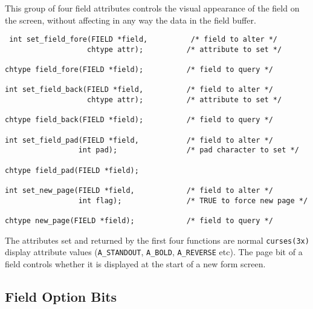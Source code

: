This group of four field attributes controls the visual appearance
of the field on the screen, without affecting in any way the data
in the field buffer.
\begin{verbatim} int set_field_fore(FIELD *field,          /* field to alter */
                   chtype attr);          /* attribute to set */

chtype field_fore(FIELD *field);          /* field to query */

int set_field_back(FIELD *field,          /* field to alter */
                   chtype attr);          /* attribute to set */

chtype field_back(FIELD *field);          /* field to query */

int set_field_pad(FIELD *field,           /* field to alter */
                 int pad);                /* pad character to set */

chtype field_pad(FIELD *field);

int set_new_page(FIELD *field,            /* field to alter */
                 int flag);               /* TRUE to force new page */

chtype new_page(FIELD *field);            /* field to query */
\end{verbatim}
The attributes set and returned by the first four functions are normal
\texttt{curses(3x)} display attribute values (\texttt{A\_STANDOUT},
\texttt{A\_BOLD}, \texttt{A\_REVERSE} etc).
The page bit of a field controls whether it is displayed at the start of
a new form screen.

\subsection{Field Option Bits}

